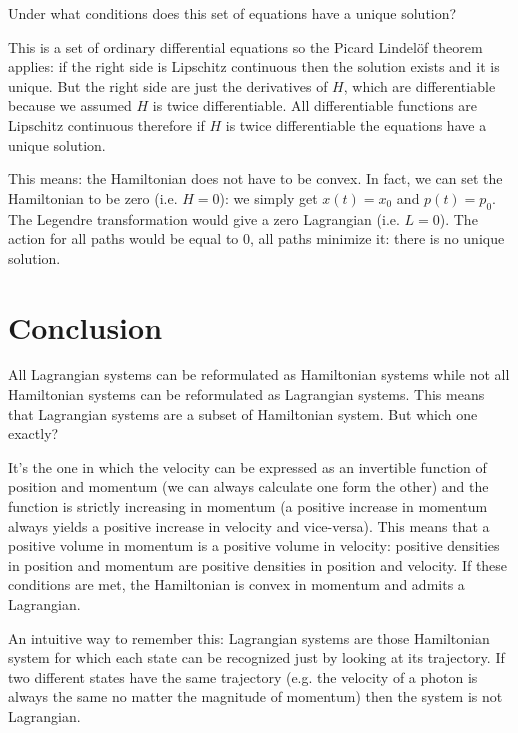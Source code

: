 \documentclass[aps,pra,10pt,floatfix,nofootinbib]{revtex4-1}
\theoremstyle{definition}
\begin{document}
Under what conditions does this set of equations have a unique solution?

This is a set of ordinary differential equations so the Picard Lindelöf theorem applies: if the right side is Lipschitz continuous then the solution exists and it is unique. But the right side are just the derivatives of $H$, which are differentiable because we assumed $H$ is twice differentiable. All differentiable functions are Lipschitz continuous therefore if $H$ is twice differentiable the equations have a unique solution.

This means: the Hamiltonian does not have to be convex. In fact, we can set the Hamiltonian to be zero (i.e. $H=0$): we simply get $x(t)=x_0$ and $p(t)=p_0$. The Legendre transformation would give a zero Lagrangian (i.e. $L=0$). The action for all paths would be equal to $0$, all paths minimize it: there is no unique solution.

\section{Conclusion}

All Lagrangian systems can be reformulated as Hamiltonian systems while not all Hamiltonian systems can be reformulated as Lagrangian systems. This means that Lagrangian systems are a subset of Hamiltonian system. But which one exactly?

It's the one in which the velocity can be expressed as an invertible function of position and momentum (we can always calculate one form the other) and the function is strictly increasing in momentum (a positive increase in momentum always yields a positive increase in velocity and vice-versa). This means that a positive volume in momentum is a positive volume in velocity: positive densities in position and momentum are positive densities in position and velocity. If these conditions are met, the Hamiltonian is convex in momentum and admits a Lagrangian.

An intuitive way to remember this: Lagrangian systems are those Hamiltonian system for which each state can be recognized just by looking at its trajectory. If two different states have the same trajectory (e.g. the velocity of a photon is always the same no matter the magnitude of momentum) then the system is not Lagrangian.
\end{document}

